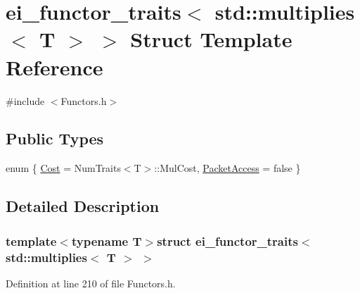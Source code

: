 \hypertarget{structei__functor__traits_3_01std_1_1multiplies_3_01_t_01_4_01_4}{\section{ei\-\_\-functor\-\_\-traits$<$ std\-:\-:multiplies$<$ T $>$ $>$ Struct Template Reference}
\label{structei__functor__traits_3_01std_1_1multiplies_3_01_t_01_4_01_4}
}


{\ttfamily \#include $<$Functors.\-h$>$}

\subsection*{Public Types}
\begin{DoxyCompactItemize}
\item 
enum \{ \hyperlink{structei__functor__traits_3_01std_1_1multiplies_3_01_t_01_4_01_4_a0515179a8bc1162a06f020005b7a4759aac543f1e0985b04808dcc300046c6f85}{Cost} = Num\-Traits$<$T$>$\-:\-:Mul\-Cost, 
\hyperlink{structei__functor__traits_3_01std_1_1multiplies_3_01_t_01_4_01_4_a0515179a8bc1162a06f020005b7a4759acc0151da75b12922d9de535c9dde151d}{Packet\-Access} = false
 \}
\end{DoxyCompactItemize}


\subsection{Detailed Description}
\subsubsection*{template$<$typename T$>$struct ei\-\_\-functor\-\_\-traits$<$ std\-::multiplies$<$ T $>$ $>$}



Definition at line 210 of file Functors.\-h.




